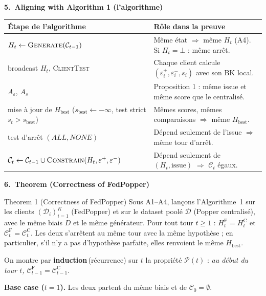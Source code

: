 \documentclass[10pt]{article}
\newcommand{\EN}[2]{\textbf{#1}\,{\scriptsize\textcolor{marine}{(#2)}}}
\newcommand{\titrebox}[2]{\needspace{10\baselineskip}\vspace{8pt}
  \begin{tcolorbox}[colback=marine, colframe=marine, arc=0pt, boxrule=0pt,
    top=4pt, bottom=4pt, left=8pt]
  \color{white}\Large\bfseries #1.~#2
  \end{tcolorbox}\vspace{2pt}}
\newcommand{\st}[1]{\par\needspace{7\baselineskip}\vspace{5pt}{\normalsize\bfseries\textcolor{marine}{#1}}\par\vspace{2pt}}
\begin{document}
\titrebox{5}{Aligning with Algorithm 1 (l'algorithme)}
\renewcommand{\arraystretch}{1.25}
\begin{tabular}{@{}L{4.2cm}L{12.2cm}@{}}
\textbf{Étape de l'algorithme} & \textbf{Rôle dans la preuve}\\\hline
$H_t\leftarrow\textsc{Generate}(\mathcal{C}_{t-1})$ & Même état $\Rightarrow$ même $H_t$ (A4). Si $H_t=\bot$ : même arrêt.\\
broadcast $H_t$, \textsc{ClientTest} & Chaque client calcule $(\varepsilon_i^+,\varepsilon_i^-,s_i)$ avec son BK local.\\
$A_\varepsilon$, $A_s$ & Proposition 1 : même issue et même score que le centralisé.\\
mise à jour de $H_{\text{best}}$ ($s_{\text{best}}\leftarrow-\infty$, test strict $s_t>s_{\text{best}}$) & Mêmes scores, mêmes comparaisons $\Rightarrow$ même $H_{\text{best}}$.\\
test d'arrêt $(\mathit{ALL},\mathit{NONE})$ & Dépend seulement de l'issue $\Rightarrow$ même tour d'arrêt.\\
$\mathcal{C}_t\leftarrow\mathcal{C}_{t-1}\cup\textsc{Constrain}(H_t,\varepsilon^+,\varepsilon^-)$ & Dépend seulement de $(H_t,\text{issue})$ $\Rightarrow$ $\mathcal{C}_t$ égaux.\\
\end{tabular}

\titrebox{6}{Theorem (Correctness of FedPopper)}
\begin{enonce}{Theorem 1 (Correctness of FedPopper)}
Sous A1--A4, lançons l'Algorithme~1 sur les clients $(\mathcal{D}_i)_{i=1}^{K}$ (FedPopper) et sur le dataset poolé $\mathcal{D}$ (Popper centralisé),
avec le même biais $D$ et le même générateur. Pour tout tour $t\ge1$ : $H_t^{\mathrm F}=H_t^{\mathrm C}$ et $\mathcal{C}_t^{\mathrm F}=\mathcal{C}_t^{\mathrm C}$.
Les deux s'arrêtent au même tour avec la même hypothèse ; en particulier, s'il n'y a pas d'hypothèse parfaite, elles renvoient le même $H_{\text{best}}$.
\end{enonce}

\st{Proof (par récurrence)}
On montre par \EN{induction}{récurrence} sur $t$ la propriété $\mathcal{P}(t)$ : \emph{au début du tour $t$, $\mathcal{C}_{t-1}^{\mathrm F}=\mathcal{C}_{t-1}^{\mathrm C}$}.

\textbf{Base case ($t=1$).} Les deux partent du même biais et de $\mathcal{C}_0=\emptyset$.
\end{document}
